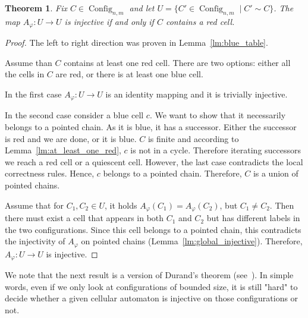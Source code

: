 \documentclass{article}
\theoremstyle{plain}
\newtheorem{theorem}{Theorem}[section]
\theoremstyle{definition}
\DeclareMathOperator{\Config}{Config}
\newcommand{\masha}[1]{{\leavevmode\color{magenta}{#1}}}
\begin{document}
\begin{theorem}\label{thm:red_cell}
    Fix $C \in \Config_{n,m}$ and let $U = \{C' \in \Config_{n,m} \mid C' \sim C\}$. The map $A_\varphi: U \to U$ is injective if and only if $C$ contains a red cell.
\end{theorem}
\begin{proof}
The left to right direction was proven in Lemma~\ref{lm:blue_table}. 

Assume than $C$ contains at least one red cell. There are two options: either all the cells in $C$ are red, or there is at least one blue cell. 

In the first case   $A_\varphi: U \to U$ is an identity mapping and it is trivially injective.
 
In the second case consider a blue cell $c$. We want to show that it necessarily belongs to a pointed chain. As it is blue, it has a successor. Either the successor is red and we are done, or it is blue. $C$ is finite and according to Lemma~\ref{lm:at_least_one_red},  $c$ is not in a cycle. Therefore iterating successors we reach a red cell or a quiescent cell. However, the last case contradicts the local correctness rules. Hence, $c$ belongs to a pointed chain. 
Therefore, $C$ is a  union of pointed chains. 

Assume that for $C_1,C_2 \in U$, it holds $A_\varphi (C_1) = A_\varphi (C_2)$, but $C_1 \neq C_2$. 
Then there must exist a cell that appears in both $C_1$ and $C_2$ but has different labels in the two configurations. 
Since this cell belongs to a pointed chain, this contradicts the injectivity of $A_\varphi$ on pointed chains (Lemma~\ref{lm:global_injective}). Therefore, $A_\varphi: U\to U$ is injective. %
\end{proof}

We note that the next result is a version of Durand’s theorem (see~\cite{DURAND1994387}). In simple words, even if we only look at configurations of bounded size, it is still "hard" to decide whether a given cellular automaton is injective on those configurations or not.
\end{document}

